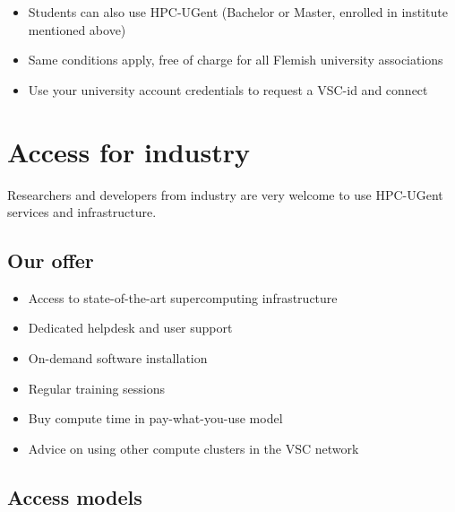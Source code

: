 \begin{itemize}
  \item Students can also use HPC-UGent (Bachelor or Master, enrolled in institute mentioned above)
  \item Same conditions apply, free of charge for all Flemish university associations
  \item Use your university account credentials to request a VSC-id and connect
\end{itemize}



\section{Access for industry}

Researchers and developers from industry are very welcome to use HPC-UGent services and infrastructure.


\subsection{Our offer}

\begin{itemize}
  \item Access to state-of-the-art supercomputing infrastructure
  \item Dedicated helpdesk and user support
  \item On-demand software installation
  \item Regular training sessions
  \item Buy compute time in pay-what-you-use model
  \item Advice on using other compute clusters in the VSC network
\end{itemize}


\subsection{Access models}

